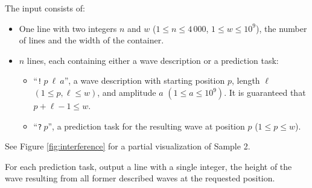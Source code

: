 \begin{Input}
  The input consists of:
  \begin{itemize}
    \item One line with two integers $n$ and $w$ ($1 \le n \le 4\,000$, $1 \le w \le 10^{9}$), the number of lines and the width of the container.
    \item $n$ lines, each containing either a wave description or a prediction task:
    \begin{itemize}
      \item ``\texttt{!$~p~\ell~a$}'', a wave description with starting position $p$, length $\ell$ $(1 \le p, \ell \le w)$, and amplitude $a$ $(1 \le a \le 10^9)$.
      It is guaranteed that $p+\ell - 1 \le w$.
      \item ``\texttt{?$~p$}'', a prediction task for the resulting wave at position $p$ ($1 \le p \le w$).
    \end{itemize}
  \end{itemize}
  See Figure \ref{fig:interference} for a partial visualization of Sample 2.
\end{Input}

\begin{Output}
  For each prediction task, output a line with a single integer, the height of the wave resulting from all former described waves at the requested position.
\end{Output}
